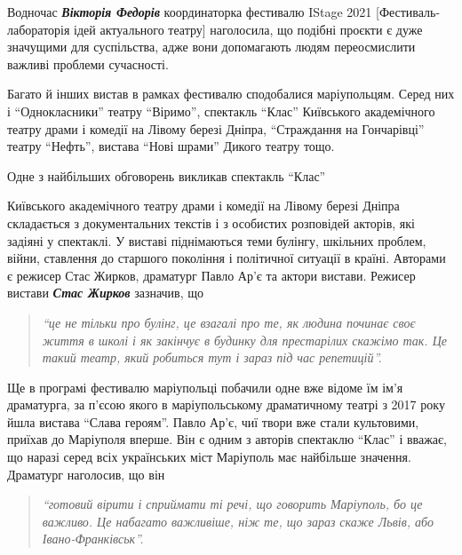 
Водночас \emph{\textbf{Вікторія Федорів}} координаторка фестивалю IStage 2021
[Фестиваль-лабораторія ідей актуального театру] наголосила, що подібні проєкти
є дуже значущими для суспільства, адже вони допомагають людям переосмислити
важливі проблеми сучасності.

Багато й інших вистав в рамках фестивалю сподобалися маріупольцям. Серед них і
\enquote{Однокласники} театру \enquote{Віримо}, спектакль  \enquote{Клас} Київського академічного
театру драми і комедії на Лівому березі Дніпра, \enquote{Страждання на Гончарівці}
театру \enquote{Нефть}, вистава \enquote{Нові шрами} Дикого театру тощо.


Одне з найбільших обговорень викликав спектакль \enquote{Клас}\par\noindent Київського академічного
театру драми і комедії на Лівому березі Дніпра складається з документальних
текстів і з особистих розповідей акторів, які задіяні у спектаклі. У виставі
піднімаються теми булінгу, шкільних проблем, війни, ставлення до старшого
покоління і політичної ситуації в країні. Авторами є режисер Стас Жирков,
драматург Павло Ар'є та актори вистави. Режисер вистави \emph{\textbf{Стас Жирков}} зазначив,
що 
\begin{quote}
\em\enquote{це не тільки про булінг, це взагалі про те, як людина починає своє життя в
школі і як закінчує в будинку для престарілих скажімо так. Це такий театр, який
робиться тут і зараз під час репетицій}.
\end{quote}


Ще в  програмі фестивалю маріупольці побачили одне вже відоме їм  ім'я
драматурга, за п'єсою якого в маріупольському драматичному театрі з 2017 року
йшла вистава \enquote{Слава героям}. Павло Ар'є, чиї твори вже стали культовими,
приїхав до Маріуполя вперше. Він є одним з авторів спектаклю \enquote{Клас} і вважає,
що наразі серед всіх українських міст Маріуполь має найбільше значення.
Драматург наголосив, що він 

\begin{quote}
\em\enquote{готовий вірити і сприймати ті речі, що говорить
Маріуполь, бо це важливо. Це набагато важливіше, ніж те, що зараз скаже Львів,
або Івано-Франківськ}.
\end{quote}

